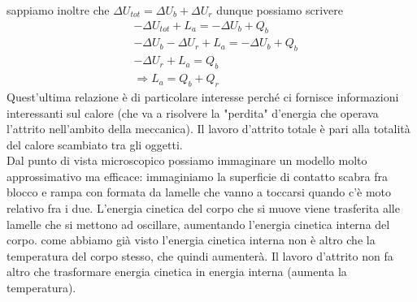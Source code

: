 \documentclass[10pt,a4paper]{article}
\begin{document}
sappiamo inoltre che $\Delta U_{tot} = \Delta U_b + \Delta U_r$ dunque possiamo scrivere
\begin{align*} 
	&-\Delta U_{tot} + L_a = - \Delta U_b + Q_b\\
	&-\Delta U_b - \Delta U_r+L_a =  - \Delta U_b + Q_b\\
	&- \Delta U_r+L_a =  Q_b\\
	&\Rightarrow L_a =  Q_b + Q_r
\end{align*} 
Quest'ultima relazione è di particolare interesse perché ci fornisce informazioni interessanti sul calore (che va a risolvere la "perdita" d'energia che operava l'attrito nell'ambito della meccanica). Il lavoro d'attrito totale è pari alla totalità del calore scambiato tra gli oggetti.\\
Dal punto di vista microscopico possiamo immaginare un modello molto approssimativo ma efficace: immaginiamo la superficie di contatto scabra fra blocco e rampa con formata da lamelle che vanno a toccarsi quando c'è moto relativo fra i due. L'energia cinetica del corpo che si muove viene trasferita alle lamelle che si mettono ad oscillare, aumentando l'energia cinetica interna del corpo. come abbiamo già visto l'energia cinetica interna non è altro che la temperatura del corpo stesso, che quindi aumenterà. Il lavoro d'attrito non fa altro che trasformare energia cinetica in energia interna (aumenta la temperatura). 
\end{document}
